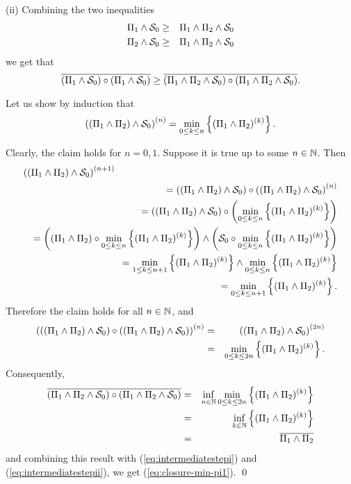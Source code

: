 (ii) Combining the two inequalities
\begin{eqnarray*}
\Pi_1 \wedge \mathcal S_0 & \geq & \Pi_1 \wedge  \Pi_2 \wedge \mathcal S_0 \\
\Pi_2 \wedge \mathcal S_0 & \geq & \Pi_1 \wedge  \Pi_2 \wedge \mathcal S_0
\end{eqnarray*}
we get that
\begin{equation}
\mylabel{eq:intermediatestepii}
 \overline{(\Pi_1 \wedge \calS_0) \circ (\Pi_1 \wedge \calS_0)} \geq \overline{(\Pi_1 \wedge  \Pi_2 \wedge \calS_0) \circ
(\Pi_1 \wedge  \Pi_2 \wedge \calS_0)}.
\end{equation}

Let us show by induction that
$$ \left( (\Pi_1 \wedge \Pi_2)
\wedge \mathcal S_0 \right)^{(n)} = \min_{0 \leq k \leq n} \left\{
(\Pi_1 \wedge \Pi_2)^{(k)} \right\} . $$

Clearly, the claim holds for $n =0,1$. Suppose it is true up to
some $n \in \mathbb{N}$. Then
\begin{eqnarray*}
  \lefteqn{\left((\Pi_1 \wedge \Pi_2) \wedge \calS_0
  \right)^{(n+1)}} \\
    & & =  \left( (\Pi_1 \wedge \Pi_2) \wedge \calS_0 \right) \circ \left( (\Pi_1 \wedge \Pi_2) \wedge \calS_0 \right)^{(n)} \\
   & & = \left( (\Pi_1 \wedge \Pi_2) \wedge \calS_0 \right) \circ  \left( \min_{0 \leq k \leq n} \left\{ (\Pi_1 \wedge \Pi_2)^{(k)} \right\} \right) \\
    & & =  \left( (\Pi_1 \wedge \Pi_2) \circ \min_{0 \leq k \leq n} \left\{ (\Pi_1 \wedge \Pi_2)^{(k)} \right\} \right) \wedge
            \left( \calS_0  \circ \min_{0 \leq k \leq n} \left\{ (\Pi_1 \wedge \Pi_2)^{(k)} \right\} \right) \\
    & & =  \min_{1 \leq k \leq n+1} \left\{ (\Pi_1 \wedge \Pi_2)^{(k)} \right\}  \wedge  \min_{0 \leq k \leq n} \left\{ (\Pi_1 \wedge \Pi_2)^{(k)} \right\} \\
   & & =  \min_{0 \leq k \leq n+1} \left\{ (\Pi_1 \wedge \Pi_2)^{(k)} \right\} .
\end{eqnarray*}
Therefore the claim holds for all $n \in \mathbb{N}$, and
\begin{eqnarray*}
 \left( \left( (\Pi_1 \wedge \Pi_2) \wedge \mathcal S_0 \right)  \circ \left( (\Pi_1 \wedge \Pi_2) \wedge \mathcal S_0 \right)\right)^{(n)}
    & = & \left( (\Pi_1 \wedge \Pi_2) \wedge \mathcal S_0 \right)^{(2n)} \\
    & = & \min_{0 \leq k \leq 2n}  \left\{ (\Pi_1 \wedge \Pi_2)^{(k)} \right\}.
\end{eqnarray*}
Consequently,
\begin{eqnarray*}
\overline{(\Pi_1 \wedge  \Pi_2 \wedge \mathcal S_0) \circ
(\Pi_1 \wedge  \Pi_2 \wedge \mathcal S_0)} & = & \inf_{n \in \mathbb{N}} \min_{0 \leq k \leq 2n}  \left\{ (\Pi_1 \wedge \Pi_2)^{(k)} \right\} \\
& = & \inf_{k \in \mathbb{N}} \left\{ (\Pi_1 \wedge \Pi_2)^{(k)} \right\} \\
& = & \overline{\Pi_1 \wedge \Pi_2}
\end{eqnarray*}
and combining this result with (\ref{eq:intermediatestepi}) and (\ref{eq:intermediatestepii}), we get (\ref{eq:closure-min-pi1}).
\qed

